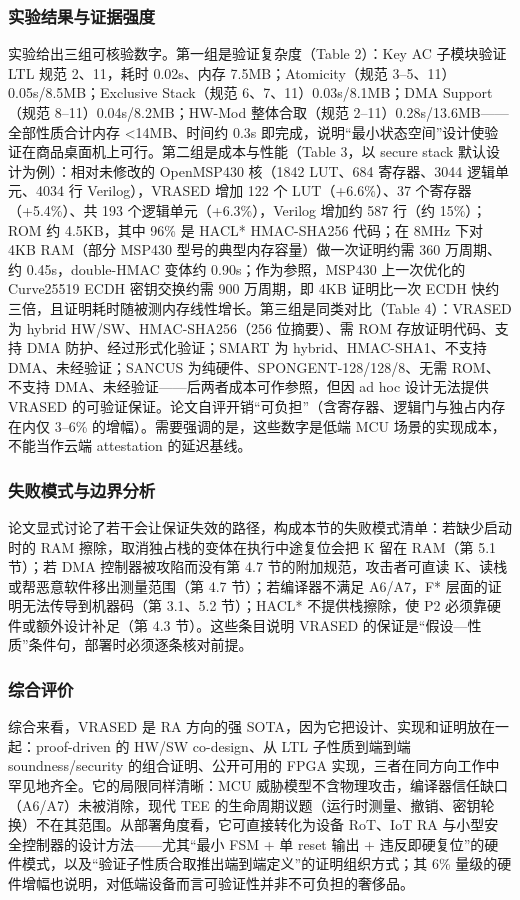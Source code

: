 \documentclass[11pt]{ctexart}
\begin{document}
\subsubsection{实验结果与证据强度}
实验给出三组可核验数字。第一组是验证复杂度（Table 2）：Key AC 子模块验证 LTL 规范 2、11，耗时 0.02s、内存 7.5MB；Atomicity（规范 3–5、11）0.05s/8.5MB；Exclusive Stack（规范 6、7、11）0.03s/8.1MB；DMA Support（规范 8–11）0.04s/8.2MB；HW-Mod 整体合取（规范 2–11）0.28s/13.6MB——全部性质合计内存 <14MB、时间约 0.3s 即完成，说明“最小状态空间”设计使验证在商品桌面机上可行。第二组是成本与性能（Table 3，以 secure stack 默认设计为例）：相对未修改的 OpenMSP430 核（1842 LUT、684 寄存器、3044 逻辑单元、4034 行 Verilog），VRASED 增加 122 个 LUT（+6.6\%）、37 个寄存器（+5.4\%）、共 193 个逻辑单元（+6.3\%），Verilog 增加约 587 行（约 15\%）；ROM 约 4.5KB，其中 96\% 是 HACL* HMAC-SHA256 代码；在 8MHz 下对 4KB RAM（部分 MSP430 型号的典型内存容量）做一次证明约需 360 万周期、约 0.45s，double-HMAC 变体约 0.90s；作为参照，MSP430 上一次优化的 Curve25519 ECDH 密钥交换约需 900 万周期，即 4KB 证明比一次 ECDH 快约三倍，且证明耗时随被测内存线性增长。第三组是同类对比（Table 4）：VRASED 为 hybrid HW/SW、HMAC-SHA256（256 位摘要）、需 ROM 存放证明代码、支持 DMA 防护、经过形式化验证；SMART 为 hybrid、HMAC-SHA1、不支持 DMA、未经验证；SANCUS 为纯硬件、SPONGENT-128/128/8、无需 ROM、不支持 DMA、未经验证——后两者成本可作参照，但因 ad hoc 设计无法提供 VRASED 的可验证保证。论文自评开销“可负担”（含寄存器、逻辑门与独占内存在内仅 3–6\% 的增幅）。需要强调的是，这些数字是低端 MCU 场景的实现成本，不能当作云端 attestation 的延迟基线。\par
\subsubsection{失败模式与边界分析}
论文显式讨论了若干会让保证失效的路径，构成本节的失败模式清单：若缺少启动时的 RAM 擦除，取消独占栈的变体在执行中途复位会把 K 留在 RAM（第 5.1 节）；若 DMA 控制器被攻陷而没有第 4.7 节的附加规范，攻击者可直读 K、读栈或帮恶意软件移出测量范围（第 4.7 节）；若编译器不满足 A6/A7，F* 层面的证明无法传导到机器码（第 3.1、5.2 节）；HACL* 不提供栈擦除，使 P2 必须靠硬件或额外设计补足（第 4.3 节）。这些条目说明 VRASED 的保证是“假设—性质”条件句，部署时必须逐条核对前提。\par
\subsubsection{综合评价}
综合来看，VRASED 是 RA 方向的强 SOTA，因为它把设计、实现和证明放在一起：proof-driven 的 HW/SW co-design、从 LTL 子性质到端到端 soundness/security 的组合证明、公开可用的 FPGA 实现，三者在同方向工作中罕见地齐全。它的局限同样清晰：MCU 威胁模型不含物理攻击，编译器信任缺口（A6/A7）未被消除，现代 TEE 的生命周期议题（运行时测量、撤销、密钥轮换）不在其范围。从部署角度看，它可直接转化为设备 RoT、IoT RA 与小型安全控制器的设计方法——尤其“最小 FSM + 单 reset 输出 + 违反即硬复位”的硬件模式，以及“验证子性质合取推出端到端定义”的证明组织方式；其 6\% 量级的硬件增幅也说明，对低端设备而言可验证性并非不可负担的奢侈品。\par
\end{document}
